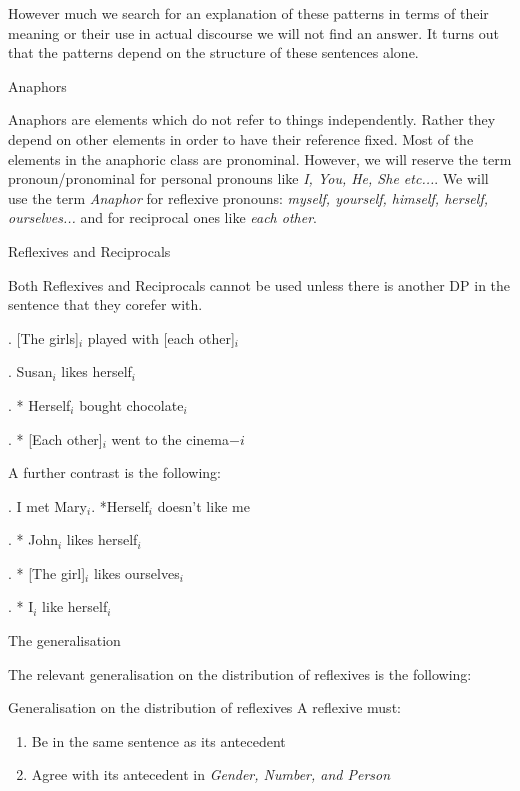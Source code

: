 \begin{frame}
  However much we search for an explanation of these patterns in terms of their meaning or their use in actual discourse we will not find an answer.  It turns out that the patterns depend on the structure of these sentences alone.
\end{frame}



\begin{frame}
  {Anaphors}

Anaphors are elements which do not refer to things independently.  Rather they depend on other elements in order to have their reference fixed.  Most of the elements in the anaphoric class are pronominal.  However, we will reserve the term pronoun/pronominal for personal pronouns like \textit{I, You, He, She etc...}.  We will use the term \textit{Anaphor} for reflexive pronouns: \textit{myself, yourself, himself, herself, ourselves...} and  for reciprocal ones like  \textit{each other}. 
\end{frame}


\begin{frame}
  {Reflexives and Reciprocals}

Both Reflexives and Reciprocals cannot be used unless there is another DP in the sentence that they corefer with.

\ex.  [The girls]$_i$ played with [each other]$_i$

\ex.  Susan$_i$ likes herself$_i$

\ex.  * Herself$_i$ bought chocolate$_i$  

\ex. * [Each other]$_i$ went to the cinema$-i$


\end{frame}


\begin{frame}
  A further contrast is the following:


\ex. 
I met Mary$_i$.  *Herself$_i$ doesn't like me


\ex.
* John$_i$ likes herself$_i$ 

\ex.  
* [The girl]$_i$ likes ourselves$_i$

\ex.
* I$_i$ like herself$_i$ 


\end{frame}



\begin{frame}
  {The generalisation}

The relevant generalisation on the distribution of reflexives is the following:

\begin{block}
{Generalisation on the distribution of reflexives}
A reflexive must:
\begin{enumerate}
\item Be in the same sentence as its antecedent
\item Agree with its antecedent in \textit{Gender, Number, and Person}
\end{enumerate}
\end{block}
\end{frame}


